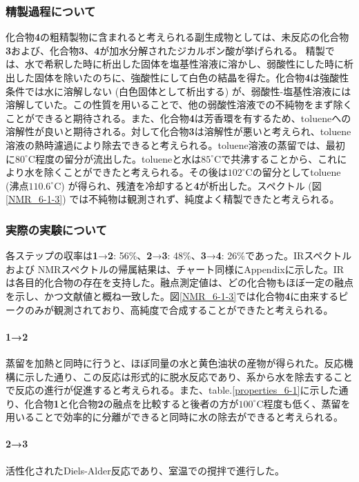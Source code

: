\documentclass{ltjsarticle}
\theoremstyle{definition}
\numberwithin{equation}{section}
\newcommand{\D}{^\circ\text{C}}
\begin{document}
\subsubsection{精製過程について}
化合物\textbf{4}の粗精製物に含まれると考えられる副生成物としては、未反応の化合物\textbf{3}および、化合物\textbf{3}、\textbf{4}が加水分解されたジカルボン酸が挙げられる。
精製では、水で希釈した時に析出した固体を塩基性溶液に溶かし、弱酸性にした時に析出した固体を除いたのちに、強酸性にして白色の結晶を得た。化合物\textbf{4}は強酸性条件では水に溶解しない (白色固体として析出する) が、弱酸性-塩基性溶液には溶解していた。この性質を用いることで、他の弱酸性溶液での不純物をまず除くことができると期待される。また、化合物\textbf{4}は芳香環を有するため、tolueneへの溶解性が良いと期待される。対して化合物\textbf{3}は溶解性が悪いと考えられ、toluene溶液の熱時濾過により除去できると考えられる。toluene溶液の蒸留では、最初に$80\D$程度の留分が流出した。tolueneと水は$85\D$で共沸する\cite{solvent_bp}ことから、これにより水を除くことができたと考えられる。その後は$102\D$の留分としてtoluene (沸点$110.6\D$) が得られ、残渣を冷却すると\textbf{4}が析出した。スペクトル (図\ref{NMR_6-1-3}) では不純物は観測されず、純度よく精製できたと考えられる。

\subsubsection{実際の実験について}
各ステップの収率は\textbf{1}→\textbf{2}: 56\%、\textbf{2}→\textbf{3}: 48\%、\textbf{3}→\textbf{4}: 26\%であった。IRスペクトルおよび NMRスペクトルの帰属結果は、チャート同様にAppendixに示した。IRは各目的化合物の存在を支持した。融点測定値は、どの化合物もほぼ一定の融点を示し、かつ文献値と概ね一致した。図\ref{NMR_6-1-3}では化合物\textbf{4}に由来するピークのみが観測されており、高純度で合成することができたと考えられる。

\paragraph{\textbf{1}→\textbf{2}}
蒸留を加熱と同時に行うと、ほぼ同量の水と黄色油状の産物が得られた。反応機構に示した通り、この反応は形式的に脱水反応であり、系から水を除去することで反応の進行が促進すると考えられる。また、table.\ref{properties_6-1}に示した通り、化合物\textbf{1}と化合物\textbf{2}の融点を比較すると後者の方が$100\D$程度も低く、蒸留を用いることで効率的に分離ができると同時に水の除去ができると考えられる。

\paragraph{\textbf{2}→\textbf{3}}
活性化されたDiels-Alder反応であり、室温での撹拌で進行した。
\end{document}
